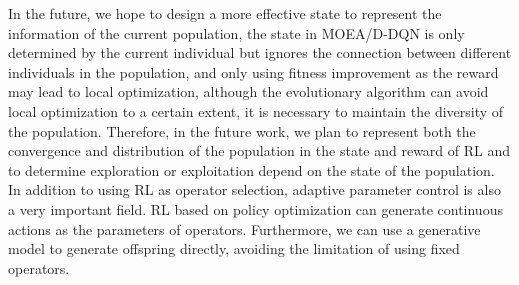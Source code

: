 \documentclass[journal]{IEEEtran}
\begin{document}
In the future, we hope to design a more effective state to represent the information of the current population, the state in MOEA/D-DQN is only determined by the current individual but ignores the connection between different individuals in the population, and only using fitness improvement as the reward may lead to local optimization, although the evolutionary algorithm can avoid local optimization to a certain extent, it is necessary to maintain the diversity of the population. Therefore, in the future work, we plan to represent both the convergence and distribution of the population in the state and reward of RL and to determine exploration or exploitation depend on the state of the population.
In addition to using RL as operator selection, adaptive parameter control is also a very important field. RL based on policy optimization can generate continuous actions as the parameters of operators. Furthermore, we can use a generative model to generate offspring directly, avoiding the limitation of using fixed operators.


\ifCLASSOPTIONcaptionsoff
    \newpage
\fi



\end{document}

